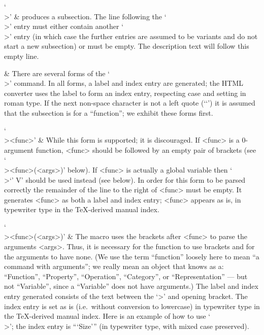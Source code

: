 `\\>' &
    produces a subsection. 
    The line following the `\\>' entry must either contain another `\\>'
    entry (in which case the further entries are assumed to be variants
    and do not start a new subsection) or must be empty.
    The description text will follow this empty line.

  & There are several forms of the `\\>' command.
    In all forms, a label and index entry are generated; the HTML 
    converter uses the label to form an index entry, respecting case
    and setting in roman type.
    If the next non-space character is not a left quote (`\lq') it is 
    assumed that the subsection is for a ``function''; we exhibit 
    these forms first. 

`\\><func>' &
    While this form is supported; it  is  discouraged.  If  <func>  is  a
    0-argument function, <func> should be followed by an  empty  pair  of
    brackets (see `\\><func>(<args>)' below). If  <func>  is  actually  a
    global variable  then  `\\>\lq<global-var>{\rq}  V'  should  be  used
    instead (see below). In order for this form to  be  parsed  correctly
    the remainder of the line to the right of <func> must  be  empty.  It
    generates <func> as both a label and index entry; <func>  appears  as
    is, in typewriter type in the {\TeX}-derived manual index.

`\\><func>(<args>)' &
    The macro uses the brackets  after  <func>  to  parse  the  arguments
    <args>. Thus, it is necessary for the function to  use  brackets  and
    for the arguments to have none. (We use the term ``function'' loosely
    here to mean ``a {\GAP} command with arguments''; we really  mean  an
    object  that  {\GAP}  knows   as   a:   ``Function'',   ``Property'',
    ``Operation'',  ``Category'',  or  ``Representation''  ---  but   not
    ``Variable'', since a ``Variable''  does  not  have  arguments.)  The
    label and index entry generated consists of the text between the  `>'
    and opening bracket. The index entry is  set  as  is  (i.e.\  without
    conversion to lowercase) in typewriter  type  in  the  {\TeX}-derived
    manual index. Here is an example of how to use `\\>'; the index entry
    is ```Size'''  (in  typewriter  type,  with  mixed  case  preserved).

